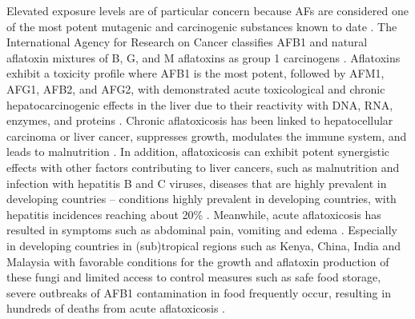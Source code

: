 Elevated exposure levels are of particular concern because AFs are considered one of the most potent mutagenic and carcinogenic substances known to date \citep{eskola2020worldwide}. The International Agency for Research on Cancer classifies AFB1 and natural aflatoxin mixtures of B, G, and M aflatoxins as group 1 carcinogens \citep{IARC2006}. Aflatoxins exhibit a toxicity profile where AFB1 is the most potent, followed by AFM1, AFG1, AFB2, and AFG2, with demonstrated acute toxicological and chronic hepatocarcinogenic effects in the liver due to their reactivity with DNA, RNA, enzymes, and proteins \citep{haque2020mycotoxin}. Chronic aflatoxicosis has been linked to hepatocellular carcinoma or liver cancer, suppresses growth, modulates the immune system, and leads to malnutrition \citep{rushing2019aflatoxin, IARC2006, haque2020mycotoxin}. In addition, aflatoxicosis can exhibit potent synergistic effects with other factors contributing to liver cancers, such as malnutrition and infection with hepatitis B and C viruses, diseases that are highly prevalent in developing countries -- conditions highly prevalent in developing countries, with hepatitis incidences reaching about 20\% \citep{williams2004human}. Meanwhile, acute aflatoxicosis has resulted in symptoms such as abdominal pain, vomiting and edema \citep{eskola2020worldwide}. Especially in developing countries in (sub)tropical regions such as Kenya, China, India and Malaysia with favorable conditions for the growth and aflatoxin production of these fungi and limited access to control measures such as safe food storage, severe outbreaks of AFB1 contamination in food frequently occur, resulting in hundreds of deaths from acute aflatoxicosis \citep{azziz2005case, eskola2020worldwide, haque2020mycotoxin}. 


